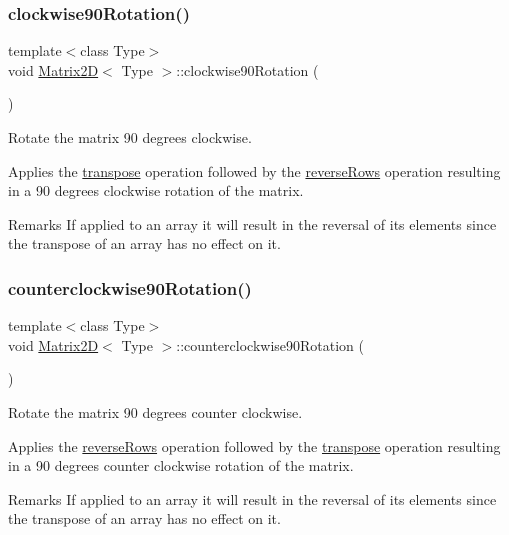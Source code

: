 \subsubsection{\texorpdfstring{clockwise90\+Rotation()}{clockwise90Rotation()}}
{\footnotesize\ttfamily template$<$class Type$>$ \\
void \hyperlink{classMatrix2D}{Matrix2D}$<$ Type $>$\+::clockwise90\+Rotation (\begin{DoxyParamCaption}{ }\end{DoxyParamCaption})\hspace{0.3cm}{\ttfamily [inline]}}



Rotate the matrix 90 degrees clockwise. 

Applies the \hyperlink{classMatrix2D_a788abe5e1fbd6a1fbd0d445aca4f8300}{transpose} operation followed by the \hyperlink{classMatrix2D_aaaefe293f1a0549afb2e506b71b18490}{reverse\+Rows} operation resulting in a 90 degrees clockwise rotation of the matrix. \begin{DoxyRemark}{Remarks}
If applied to an array it will result in the reversal of its elements since the transpose of an array has no effect on it. 
\end{DoxyRemark}
\mbox{\label{classMatrix2D_a3fc1bc77793995134f6d2a9095eb57cb}} 
\subsubsection{\texorpdfstring{counterclockwise90\+Rotation()}{counterclockwise90Rotation()}}
{\footnotesize\ttfamily template$<$class Type$>$ \\
void \hyperlink{classMatrix2D}{Matrix2D}$<$ Type $>$\+::counterclockwise90\+Rotation (\begin{DoxyParamCaption}{ }\end{DoxyParamCaption})\hspace{0.3cm}{\ttfamily [inline]}}



Rotate the matrix 90 degrees counter clockwise. 

Applies the \hyperlink{classMatrix2D_aaaefe293f1a0549afb2e506b71b18490}{reverse\+Rows} operation followed by the \hyperlink{classMatrix2D_a788abe5e1fbd6a1fbd0d445aca4f8300}{transpose} operation resulting in a 90 degrees counter clockwise rotation of the matrix. \begin{DoxyRemark}{Remarks}
If applied to an array it will result in the reversal of its elements since the transpose of an array has no effect on it. 
\end{DoxyRemark}
\mbox{\label{classMatrix2D_afd2fbe10a27044f6e716242fde6a645a}} 

